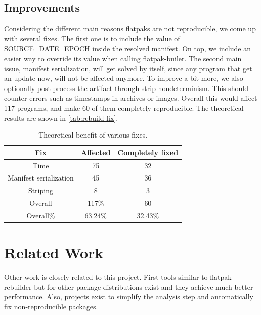 \documentclass[a4paper,11pt,oneside]{report}
\theoremstyle{definition}
\newcommand{\sysname}{flatpak-rebuilder\xspace}
\newcommand{\fb}{flatpak-builer\xspace}
\newcommand{\sde}{SOURCE\_DATE\_EPOCH\xspace}
\begin{document}
\section{Improvements}
Considering the different main reasons flatpaks are not reproducible, we come
up with several fixes. The first one is to include the value of \sde inside the
resolved manifest. On top, we include an easier way to override its value when
calling \fb.
The second main issue, manifest serialization, will get solved by itself, since
any program that get an update now, will not be affected anymore.
To improve a bit more, we also optionally post process the artifact through
strip-nondeterminism. This should counter errors such as timestamps in archives
or images.
Overall this would affect 117 programs, and make 60 of them completely
reproducible. The theoretical results are shown in \autoref{tab:rebuild-fix}.

\begin{table}[h]
    \centering
        \begin{tabular}{|c|c|c|}
            \hline
            Fix & Affected & Completely fixed\\
            \hline
            Time & 75 & 32\\
            \hline
            Manifest serialization & 45 & 36 \\
            \hline
            Striping & 8 & 3\\
            \hline
            Overall & 117\% & 60\\
            \hline
            Overall\% & 63.24\% & 32.43\%\\
            \hline
        \end{tabular}
    \caption{Theoretical benefit of various fixes.}
    \label{tab:rebuild-fix}
\end{table}

\chapter{Related Work}
\label{chap:relw}

Other work is closely related to this project. First tools similar to \sysname
but for other package distributions exist and they achieve much better
performance. Also, projects exist to simplify the analysis step and
automatically fix non-reproducible packages.
\end{document}
